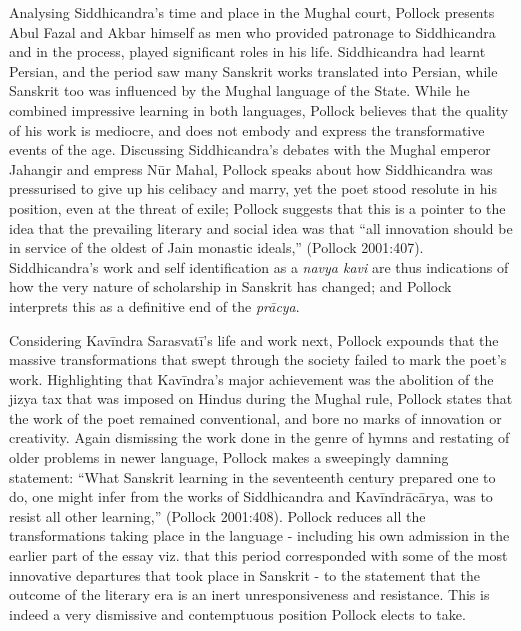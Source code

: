 Analysing Siddhicandra’s time and place in the Mughal court, Pollock presents Abul Fazal and Akbar himself as men who provided patronage to Siddhicandra and in the process, played significant roles in his life. Siddhicandra had learnt Persian, and the period saw many Sanskrit works translated into Persian, while Sanskrit too was influenced by the Mughal language of the State. While he combined impressive learning in both languages, Pollock believes that the quality of his work is mediocre, and does not embody and express the transformative events of the age. Discussing Siddhicandra’s debates with the Mughal emperor Jahangir and empress Nūr Mahal, Pollock speaks about how Siddhicandra was pressurised to give up his celibacy and marry, yet the poet stood resolute in his position, even at the threat of exile; Pollock suggests that this is a pointer to the idea that the prevailing literary and social idea was that “all innovation should be in service of the oldest of Jain monastic ideals,” (Pollock 2001:407). Siddhicandra’s work and self identification as a {\sl navya kavi} are thus indications of how the very nature of scholarship in Sanskrit has changed; and Pollock interprets this as a definitive end of the {\sl prācya}.

Considering Kavīndra Sarasvatī’s life and work next, Pollock expounds that the massive transformations that swept through the society failed to mark the poet’s work. Highlighting that Kavīndra’s major achievement was the abolition of the jizya tax that was imposed on Hindus during the Mughal rule, Pollock states that the work of the poet remained conventional, and bore no marks of innovation or creativity. Again dismissing the work done in the genre of hymns and restating of older problems in newer language, Pollock makes a sweepingly damning statement: “What Sanskrit learning in the seventeenth century prepared one to do, one might infer from the works of Siddhicandra and Kavīndrācārya, was to resist all other learning,” (Pollock 2001:408). Pollock reduces all the transformations taking place in the language - including his own admission in the earlier part of the essay viz. that this period corresponded with some of the most innovative departures that took place in Sanskrit - to the statement that the outcome of the literary era is an inert unresponsiveness and resistance. This is indeed a very dismissive and contemptuous position Pollock elects to take.

